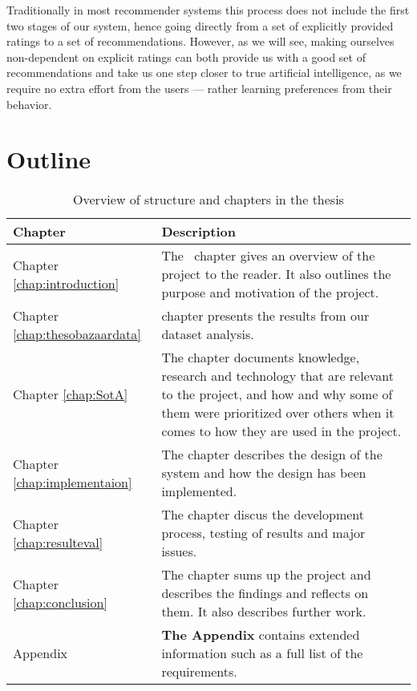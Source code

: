 Traditionally in most recommender systems this process does not include the
first two stages of our system, hence going directly from a set of explicitly
provided ratings to a set of recommendations. However, as we will see, making
ourselves non-dependent on explicit ratings can both provide us with a good
set of recommendations and take us one step closer to true artificial
intelligence, as we require no extra effort from the users --- rather learning
preferences from their behavior.

\section{Outline}
\begin{table}[H]
  \centering
  \begin{tabular}{lp{11cm}}
  \toprule
    \textbf{Chapter}      & \textbf{Description} \\
  \midrule

    Chapter \ref{chap:introduction} & The~\nameref{chap:introduction} chapter gives an overview of the
    project to the reader. It also outlines the purpose and motivation of the
    project.  \\[1.5ex]

    Chapter \ref{chap:thesobazaardata} & \nameref{chap:thesobazaardata} chapter presents the results from our
    dataset analysis. \\[1.5ex]

    Chapter \ref{chap:SotA} & The \nameref{chap:SotA} chapter documents knowledge,
    research and technology that are relevant to the project, and how and why
    some of them were prioritized over others when it comes to how they are
    used in the project. \\[1.5ex]

    Chapter \ref{chap:implementaion} & The \nameref{chap:implementaion} chapter describes the design of the
    system and how the design has been implemented. \\[1.5ex]

    Chapter \ref{chap:resulteval} & The \nameref{chap:resulteval} chapter discus the development process,
    testing of results and major issues. \\[1.5ex]

    Chapter \ref{chap:conclusion} & The \nameref{chap:conclusion} chapter sums up the project and describes the
    findings and reflects on them. It also describes further work.
    \\[1.5ex]

    Appendix & \textbf{The Appendix} contains extended information such as a full list of the requirements. \\

  \bottomrule
  \end{tabular}
  \caption{Overview of structure and chapters in the thesis}
  \label{table-reportstructure}
\end{table}
